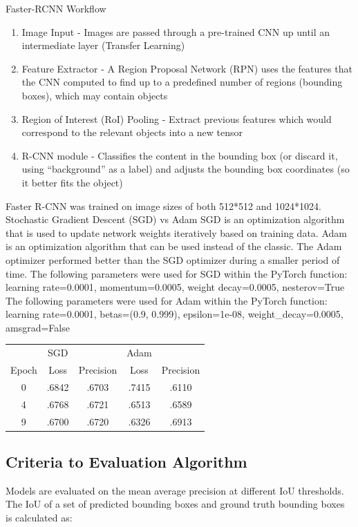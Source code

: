 \documentclass[utf8]{frontiersSCNS} %
\begin{document}
Faster-RCNN Workflow
\begin{enumerate}[labelwidth=.5cm,labelindent=4pt,leftmargin=1.2cm,label=\bfseries  \arabic*.,align=left]
  \item Image Input - Images are passed through a pre-trained CNN up until an intermediate layer (Transfer Learning)
  \item Feature Extractor - A Region Proposal Network (RPN) uses the features that the CNN computed to find up to a predefined number of regions (bounding boxes), which may contain objects
  \item Region of Interest (RoI) Pooling - Extract previous features which would correspond to the relevant objects into a new tensor
  \item R-CNN module - Classifies the content in the bounding box (or discard it, using “background” as a label) and adjusts the bounding box coordinates (so it better fits the object)
\end{enumerate}
Faster R-CNN was trained on image sizes of both 512*512 and 1024*1024.  
Stochastic Gradient Descent (SGD) vs Adam
SGD is an optimization algorithm that is used to update network weights iteratively based on training data.  Adam is an optimization algorithm that can be used instead of the classic.
The Adam optimizer performed better than the SGD optimizer during a smaller period of time. 
The following parameters were used for SGD within the PyTorch function:  learning rate=0.0001, momentum=0.0005, weight decay=0.0005, nesterov=True
The following parameters were used for Adam within the PyTorch function:  learning rate=0.0001, betas=(0.9, 0.999), epsilon=1e-08, weight\_decay=0.0005, amsgrad=False

\begin{center}
\begin{tabular}{||c c c c c||} 
\hline
& SGD &   & Adam &  \\ [0.5ex] 
Epoch & Loss & Precision & Loss & Precision \\
\hline\hline
0 & .6842 & .6703 & .7415 & .6110 \\ 
\hline
4 & .6768 & .6721 & .6513 & .6589 \\
\hline
9 & .6700 & .6720 & .6326 & .6913 \\
\hline
\end{tabular}
\end{center}

\subsection{Criteria to Evaluation Algorithm}
Models are evaluated on the mean average precision at different IoU thresholds. The IoU of a set of predicted bounding boxes and ground truth bounding boxes is calculated as:
\end{document}
